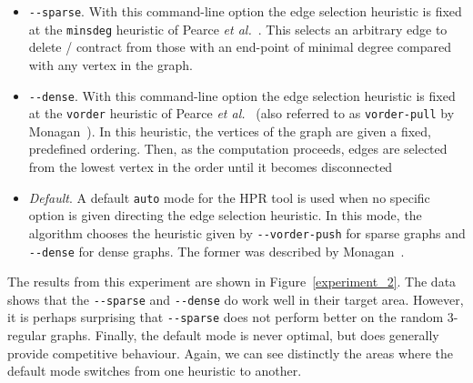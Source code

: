 \begin{itemize}
\item \verb+--sparse+.  With this command-line option the edge selection heuristic is fixed at the \verb+minsdeg+ heuristic of Pearce {\em et al.}~\cite{PHR09}.  This selects an arbitrary edge to delete / contract from those with an end-point of minimal degree compared with any vertex in the graph.
\item \verb+--dense+.  With this command-line option the edge selection heuristic is fixed at the \verb+vorder+ heuristic of Pearce {\em et al.}~\cite{PHR09} (also referred to as \verb+vorder-pull+ by Monagan~\cite{Mon12}).  In this heuristic, the vertices of the graph are given a fixed, predefined ordering. Then, as the computation proceeds, edges are selected from the lowest vertex in the order until it becomes disconnected
\item {\em Default}.  A default \verb+auto+ mode for the HPR tool is used when no specific option is given directing the edge selection heuristic.  In this mode, the algorithm chooses the heuristic given by \verb+--vorder-push+ for sparse graphs and \verb+--dense+ for dense graphs.  The former was described by Monagan~\cite{Mon12}.  
\end{itemize}

The results from this experiment are shown in Figure~\ref{experiment_2}.  The data shows that the \verb+--sparse+ and \verb+--dense+ do work well in their target area.  However, it is perhaps surprising that \verb+--sparse+ does not perform better on the random 3-regular graphs.  Finally, the default mode is never optimal, but does generally provide competitive behaviour.  Again, we can see distinctly the areas where the default mode switches from one heuristic to another.

